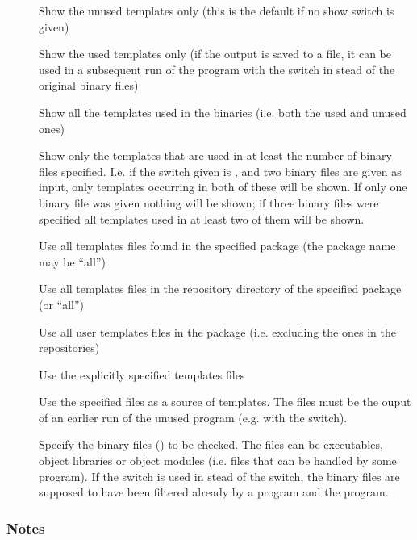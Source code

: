 \begin{description}
\item[]
   Show the unused templates only (this is the default if no show switch is
   given)
\item[]
   Show the used templates only (if the output is saved to a file, it can be
   used in a subsequent run of the  program with the 
   switch in stead of the original binary files)
\item[]
   Show all the templates used in the binaries (i.e. both the used and unused
   ones)
\item[]
   Show only the templates that are used in at least the number of binary
   files specified. I.e. if the switch given is , and two binary
   files are given as input, only templates occurring in both of these will
   be shown. If only one binary file was given nothing will be shown; if
   three binary files were specified all templates used in at least two of
   them will be shown.
\item[]
   Use all templates files found in the specified package (the package name
   may be ``all'')
\item[]
   Use all templates files in the repository directory of the specified
   package (or ``all'')
\item[]
   Use all user templates files in the package (i.e. excluding the ones in
   the repositories)
\item[]
   Use the explicitly specified templates files
\item[]
   Use the specified files as a source of templates. The files must be the
   ouput of an earlier run of the unused program (e.g. with the 
   switch).
\item[]
   Specify the binary files () to be checked. The files can be
   executables, object libraries or object modules (i.e. files that can be
   handled by some  program). If the  switch is used in stead
   of the  switch, the binary files are supposed to have been
   filtered already by a  program and the  program.
\end{description}

\subsubsection*{Notes}

